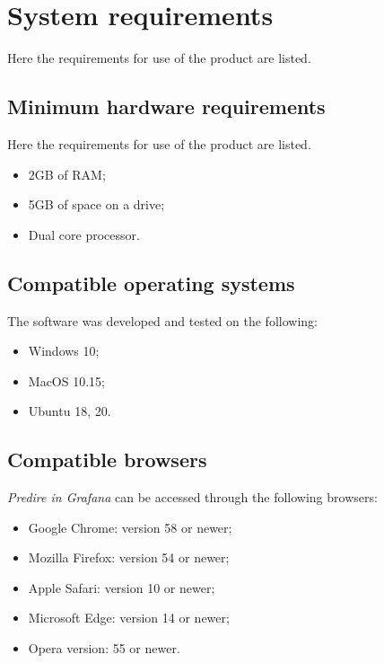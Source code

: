 \section{System requirements}
Here the requirements for use of the product are listed.

\subsection{Minimum hardware requirements}
Here the requirements for use of the product are listed.
\begin{itemize}
	\item 2GB of RAM;
	\item 5GB of space on a drive;
	\item Dual core processor.	
\end{itemize}

\subsection{Compatible operating systems}
The software was developed and tested on the following:
\begin{itemize}
	\item Windows 10;
	\item MacOS 10.15;
	\item Ubuntu 18, 20.
\end{itemize}

\subsection{Compatible browsers}
\textit{Predire in Grafana} can be accessed through the following browsers:
\begin{itemize}
	\item Google Chrome: version 58 or newer;
	\item Mozilla Firefox: version 54 or newer;
	\item Apple Safari: version 10 or newer;
	\item Microsoft Edge: version 14 or newer;
	\item Opera version: 55 or newer.
\end{itemize}



